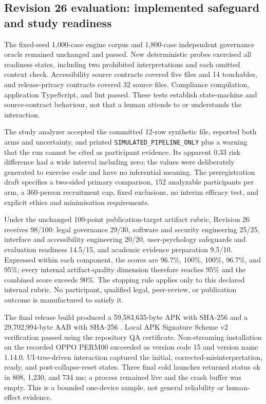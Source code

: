 

\subsection{Revision 26 evaluation: implemented safeguard and study readiness}

The fixed-seed 1,000-case engine corpus and 1,800-case independent governance oracle remained unchanged and passed. New deterministic probes exercised all readiness states, including two prohibited interpretations and each omitted context check. Accessibility source contracts covered five files and 14 touchables, and release-privacy contracts covered 32 source files. Compliance compilation, application TypeScript, and lint passed. These tests establish state-machine and source-contract behaviour, not that a human attends to or understands the interaction.

The study analyzer accepted the committed 12-row synthetic file, reported both arms and uncertainty, and printed \texttt{SIMULATED\_PIPELINE\_ONLY} plus a warning that the run cannot be cited as participant evidence. Its apparent 0.33 risk difference had a wide interval including zero; the values were deliberately generated to exercise code and have no inferential meaning. The preregistration draft specifies a two-sided primary comparison, 152 analyzable participants per arm, a 360-person recruitment cap, fixed exclusions, no interim efficacy test, and explicit ethics and minimisation requirements.

Under the unchanged 100-point publication-target artifact rubric, Revision 26 receives 98/100: legal governance 29/30, software and security engineering 25/25, interface and accessibility engineering 20/20, user-psychology safeguards and evaluation readiness 14.5/15, and academic evidence preparation 9.5/10. Expressed within each component, the scores are 96.7\%, 100\%, 100\%, 96.7\%, and 95\%; every internal artifact-quality dimension therefore reaches 95\% and the combined score exceeds 90\%. The stopping rule applies only to this declared internal rubric. No participant, qualified legal, peer-review, or publication outcome is manufactured to satisfy it.

The final release build produced a 59,583,635-byte APK with SHA-256 \texttt{} and a 29,702,994-byte AAB with SHA-256 \texttt{}. Local APK Signature Scheme v2 verification passed using the repository QA certificate. Non-streaming installation on the recorded OPPO PERM00 succeeded as version code 15 and version name 1.14.0. UI-tree-driven interaction captured the initial, corrected-misinterpretation, ready, and post-collapse-reset states. Three final cold launches returned status ok in 808, 1,230, and 734 ms; a process remained live and the crash buffer was empty. This is a bounded one-device sample, not general reliability or human-effect evidence.
